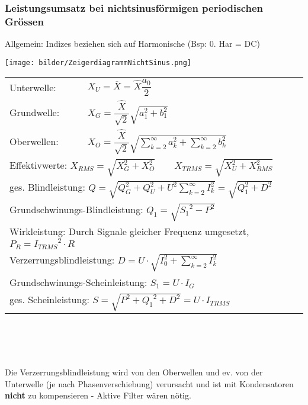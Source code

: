 		\subsubsection{Leistungsumsatz bei nichtsinusf\"ormigen periodischen Gr\"ossen}
		\begin{minipage}[c]{7.5cm}
			\parbox{4cm}{Allgemein: Indizes beziehen sich auf Harmonische (Bsp: 0. Har = DC)\\}
			\texttt{[image: bilder/ZeigerdiagrammNichtSinus.png]}     
    	\end{minipage}
		\begin{minipage}[c]{10.5cm}   
    		\noindent
    		\renewcommand{\arraystretch}{2.0}
    		\begin{tabular}{p{1.8cm} p{5.6cm}}
        		Unterwelle: 
        			& $X_{U} = \overline{X} = \hat{X}\dfrac{a_0}{2}  \qquad $  \\
	     		Grundwelle: 
	     			& $X_{G} = \dfrac{\hat{X}}{\sqrt{2}} \sqrt{a_1^2 + b_1^2} \qquad  $   \\
	     		Oberwellen: 
	     			& $X_{O} = \dfrac{\hat{X}}{\sqrt{2}}
	     			\sqrt{\sum\limits_{k=2}^{\infty}a_k^2 +\sum\limits_{k=2}^{\infty}b_k^2}
	     			\qquad $  \\ 
	     		\multicolumn{2}{l}{Effektivwerte: $X_{RMS} = \sqrt{X_G^2 + X_O^2} \qquad X_{TRMS} =
	     			\sqrt{X_U^2 + X_{RMS}^2}$ } \\
				\multicolumn{2}{l}{ges. Blindleistung: 
					$Q = 	\sqrt{Q_G^2 + Q_U^2 + U^2 \sum\limits_{k=2}^{\infty}I_k^2} = \sqrt{Q_1^2 + D^2}$} \\ 
				\multicolumn{2}{l}{Grundschwinungs-Blindleistung: 
					$Q_1 = \sqrt{{S_1}^2 - P^2}$} \\
				\multicolumn{2}{l}{Wirkleistung: 
					Durch Signale gleicher Frequenz umgesetzt, $P_R = {I_{TRMS}}^2 \cdot R$} \\
				\multicolumn{2}{l}{Verzerrungsblindleistung: 
					$D = U \cdot \sqrt{I_0^2 + \sum\limits_{k=2}^{\infty}I_k^2}$} \\
				\multicolumn{2}{l}{Grundschwinungs-Scheinleistung: 
					$S_1 = U \cdot I_G$} \\
				\multicolumn{2}{l}{ges. Scheinleistung: 
					$S = \sqrt{P^2 + {Q_1}^2 + D^2} = U \cdot I_{TRMS}$} \\
		 	\end{tabular} \\
		 \renewcommand{\arraystretch}{1}
     	\end{minipage}    		\\ \\
     	Die Verzerrungsblindleistung wird von den Oberwellen und ev. von der Unterwelle (je
     	nach Phasenverschiebung) verursacht und ist mit Kondensatoren \textbf{nicht} zu kompensieren -
     	Aktive Filter w\"aren n\"otig.
		\\		
		
